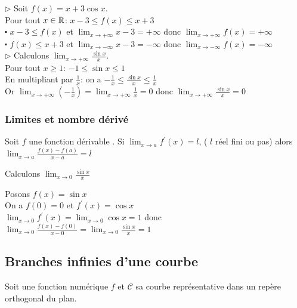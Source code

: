 \begin{example}
$\triangleright $ Soit $ f(x)= x+ 3\cos x $.\\
Pour tout $x\in\mathbb{R}$: \quad $ x-3\leq f(x)\leq x+3 $ \\
$ \centerdot $ $ x-3\leq f(x)$ et $\displaystyle \lim_{x \to +\infty}x-3=+\infty  $ donc $ \displaystyle \lim_{x \to +\infty}f(x)=+\infty $\\
$ \centerdot $ $  f(x)\leq x+3$ et $\displaystyle \lim_{x \to -\infty}x-3=-\infty  $ donc $ \displaystyle \lim_{x \to -\infty}f(x)=-\infty $ \\

$ \triangleright $ Calculons $\displaystyle\lim_{x \to +\infty}\frac{\sin x}{x} $.\\

Pour tout $ x\geq 1 $: $ -1\leq\sin x \leq 1 $ \\
En multipliant par $ \frac{1}{x} $: on a $ -\frac{1}{x}\leq \frac{\sin x}{x} \leq\frac{1}{x} $\\
Or $\displaystyle\lim_{x \to +\infty}(-\frac{1}{x})= \displaystyle\lim_{x \to +\infty}\frac{1}{x}=0$ donc $\displaystyle\lim_{x \to +\infty}\frac{\sin x}{x}=0 $
\end{example}


\subsubsection{Limites et nombre dérivé}

\begin{theorem}
Soit $ f $ une fonction dérivable .
Si $\displaystyle \lim_{x \to a}f^{'}(x)=l$,\;  ( $l$ réel fini ou pas) alors $\displaystyle\lim_{x \to a} \frac{f(x)-f(a)}{x-a}=l$
\end{theorem}

\begin{example}
Calculons $\displaystyle\lim_{x \to 0}\frac{\sin x}{x} $

Posons $ f(x)=\sin x $\\
On a $ f(0)=0 $ et  $ f^{'}(x)=\cos x$\\
 $ \displaystyle\lim_{x \to 0}f^{'}(x)=\displaystyle\lim_{x \to 0}\cos x=1 $ donc $\displaystyle \lim_{x \to 0} \frac{f(x)-f(0)}{x-0}=\displaystyle \lim_{x \to 0}\frac{\sin x}{x}=1$
\end{example}

\subsection{Branches infinies d'une courbe}
Soit une fonction numérique $ f $ et $ \mathcal{C} $ sa courbe représentative dans un repère orthogonal du plan.
